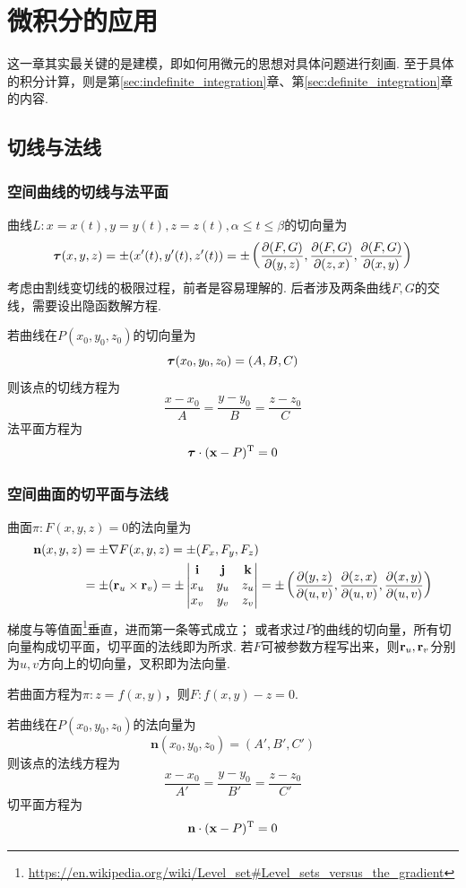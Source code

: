 
\section{微积分的应用}
这一章其实最关键的是建模，即如何用微元的思想对具体问题进行刻画. 至于具体的积分计算，则是第\ref{sec:indefinite_integration}章、第\ref{sec:definite_integration}章的内容.

\subsection{切线与法线}
\subsubsection{空间曲线的切线与法平面}
\label{sub:sub:sec:tangent}
曲线$L:x=x(t),y=y(t),z=z(t),\alpha\leq t\leq\beta$的切向量为
\[\bm{\tau}(x,y,z)=\pm(x'(t),y'(t),z'(t))=\pm\left(\dfrac{\partial (F,G)}{\partial (y,z)},\dfrac{\partial (F,G)}{\partial (z,x)},\dfrac{\partial (F,G)}{\partial (x,y)}\right)\]
考虑由割线变切线的极限过程，前者是容易理解的.
后者涉及两条曲线$F,G$的交线，需要设出隐函数解方程.
\par 若曲线在$P(x_0,y_0,z_0)$的切向量为
\[\bm{\tau}(x_0,y_0,z_0)=(A,B,C)\]
则该点的切线方程为
\[\frac{x-x_0}{A}=\frac{y-y_0}{B}=\frac{z-z_0}{C}\]
法平面方程为
\[\bm{\tau}\cdot(\mathbf{x}-P)^{\mathrm{T}}=0\]

\subsubsection{空间曲面的切平面与法线}
\label{sub:sub:sec:normal}
曲面$\pi:F(x,y,z)=0$的法向量为
\[\begin{aligned}
\mathbf{n}(x,y,z)&=\pm\nabla F(x,y,z)=\pm(F_x,F_y,F_z)\\
&=\pm(\mathbf{r}_u\times\mathbf{r}_v)=\pm\begin{vmatrix}\mathbf{i}&\mathbf{j}&\mathbf{k}\\x_u&y_u&z_u\\x_v&y_v&z_v\end{vmatrix}=\pm\left(\dfrac{\partial (y,z)}{\partial (u,v)},\dfrac{\partial (z,x)}{\partial (u,v)},\dfrac{\partial (x,y)}{\partial (u,v)}\right)
\end{aligned}\]
梯度与等值面\footnote{\url{https://en.wikipedia.org/wiki/Level_set\#Level_sets_versus_the_gradient}}垂直，进而第一条等式成立；
或者求过$P$的曲线的切向量，所有切向量构成切平面，切平面的法线即为所求.
若$F$可被参数方程写出来，则$\mathbf{r}_u,\mathbf{r}_v$分别为$u,v$方向上的切向量，叉积即为法向量.
\par 若曲面方程为$\pi:z=f(x,y)$，则$F:f(x,y)-z=0$.
\par 若曲线在$P(x_0,y_0,z_0)$的法向量为
\[\mathbf{n}(x_0,y_0,z_0)=(A',B',C')\]
则该点的法线方程为
\[\frac{x-x_0}{A'}=\frac{y-y_0}{B'}=\frac{z-z_0}{C'}\]
切平面方程为
\[\mathbf{n}\cdot(\mathbf{x}-P)^{\mathrm{T}}=0\]

